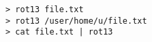 \begin{lstlisting}[caption=Examples of how a user will interact with the utility from the console]
> rot13 file.txt
> rot13 /user/home/u/file.txt
> cat file.txt | rot13
\end{lstlisting}
